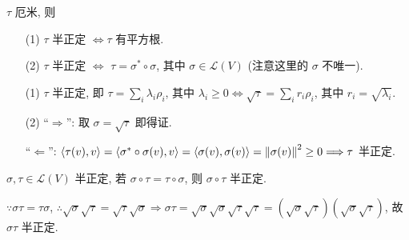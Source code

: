 \documentclass{note}
\begin{document}
\begin{thm}
    $\tau$ 厄米, 则
    \begin{itemize}
        \item[(1)] $\tau$ 半正定 $\Longleftrightarrow\tau$ 有平方根.
        \item[(2)] $\tau$ 半正定 $\Longleftrightarrow$ $\tau=\sigma^*\circ\sigma$, 其中 $\sigma\in\mathcal{L}(V)$ (注意这里的 $\sigma$ 不唯一).
    \end{itemize}
\end{thm}
\begin{pf}
    \begin{itemize}
        \item[(1)] $\tau$ 半正定, 即 $\tau=\sum_i\lambda_i\rho_i$, 其中 $\lambda_i\geq 0\Longleftrightarrow\sqrt{\tau}=\sum_ir_i\rho_i$, 其中 $r_i=\sqrt{\lambda_i}$.
        \item[(2)] ``$\Longrightarrow$'': 取 $\sigma=\sqrt{\tau}$ 即得证.

        ``$\Longleftarrow$'': $\langle\tau(v),v\rangle=\langle\sigma^*\circ\sigma(v),v\rangle=\langle\sigma(v),\sigma(v)\rangle=\left\lVert\sigma(v)\right\rVert^2\geq 0\Longrightarrow\tau$ 半正定.
    \end{itemize}
\end{pf}

\begin{thm}
    $\sigma,\tau\in\mathcal{L}(V)$ 半正定, 若 $\sigma\circ\tau=\tau\circ\sigma$, 则 $\sigma\circ\tau$ 半正定.
\end{thm}
\begin{pf}
    $\because\sigma\tau=\tau\sigma$, $\therefore\sqrt{\sigma}\sqrt{\tau}=\sqrt{\tau}\sqrt{\sigma}\Longrightarrow\sigma\tau=\sqrt{\sigma}\sqrt{\sigma}\sqrt{\tau}\sqrt{\tau}=(\sqrt{\sigma}\sqrt{\tau})(\sqrt{\sigma}\sqrt{\tau})$, 故 $\sigma\tau$ 半正定.
\end{pf}
\end{document}
